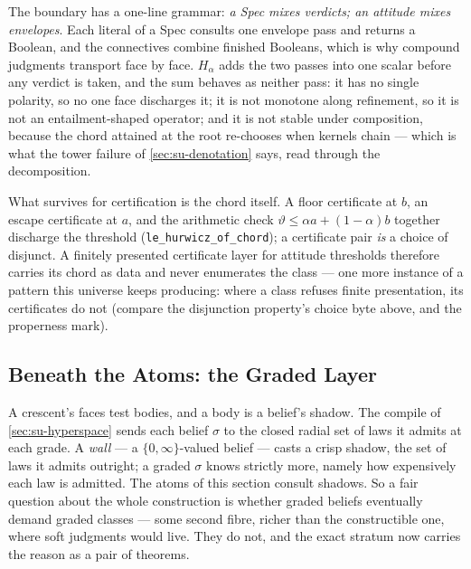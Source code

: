 The boundary has a one-line grammar: \emph{a Spec mixes verdicts;
an attitude mixes envelopes}. Each literal of a Spec consults one
envelope pass and returns a Boolean, and the connectives combine
finished Booleans, which is why compound judgments transport face
by face. $H_\alpha$ adds the two passes into one scalar before any
verdict is taken, and the sum behaves as neither pass: it has no
single polarity, so no one face discharges it; it is not monotone
along refinement, so it is not an entailment-shaped operator; and
it is not stable under composition, because the chord attained at
the root re-chooses when kernels chain --- which is what the tower
failure of \autoref{sec:su-denotation} says, read through the
decomposition.

What survives for certification is the chord itself. A floor
certificate at $b$, an escape certificate at $a$, and the
arithmetic check $\vartheta \le \alpha a + (1-\alpha) b$ together
discharge the threshold (\texttt{le\_hurwicz\_of\_chord}); a
certificate pair \emph{is} a choice of disjunct. A finitely
presented certificate layer for attitude thresholds therefore
carries its chord as data and never enumerates the class --- one
more instance of a pattern this universe keeps producing: where a
class refuses finite presentation, its certificates do not
(compare the disjunction property's choice byte above, and the
properness mark).

\subsection{Beneath the Atoms: the Graded Layer}

A crescent's faces test bodies, and a body is a belief's shadow.
The compile of \autoref{sec:su-hyperspace} sends each belief
$\sigma$ to the closed radial set of laws it admits at each grade.
A \emph{wall} --- a $\{0,\infty\}$-valued belief --- casts a
crisp shadow, the set of laws it admits outright; a graded
$\sigma$ knows strictly more, namely how expensively each law is
admitted. The atoms of this section consult shadows. So a fair
question about the whole construction is whether graded beliefs
eventually demand graded classes --- some second fibre, richer
than the constructible one, where soft judgments would live. They
do not, and the exact stratum now carries the reason as a pair of
theorems.


